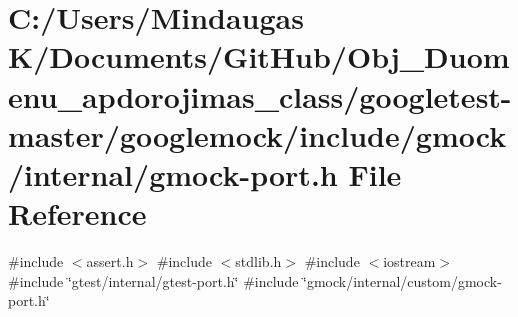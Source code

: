 \hypertarget{googletest-master_2googlemock_2include_2gmock_2internal_2gmock-port_8h}{}\section{C\+:/\+Users/\+Mindaugas K/\+Documents/\+Git\+Hub/\+Obj\+\_\+\+Duomenu\+\_\+apdorojimas\+\_\+class/googletest-\/master/googlemock/include/gmock/internal/gmock-\/port.h File Reference}
\label{googletest-master_2googlemock_2include_2gmock_2internal_2gmock-port_8h}
{\ttfamily \#include $<$assert.\+h$>$}\newline
{\ttfamily \#include $<$stdlib.\+h$>$}\newline
{\ttfamily \#include $<$iostream$>$}\newline
{\ttfamily \#include \char`\"{}gtest/internal/gtest-\/port.\+h\char`\"{}}\newline
{\ttfamily \#include \char`\"{}gmock/internal/custom/gmock-\/port.\+h\char`\"{}}\newline
